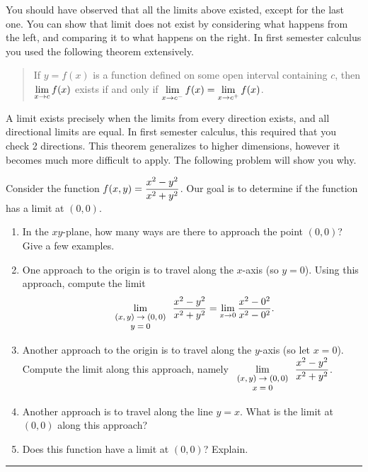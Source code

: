 You should have observed that all the limits above existed, except for the last one.  You can show that limit does not exist by considering what happens from the left, and comparing it to what happens on the right.  In first semester calculus you used the following theorem extensively. 
\begin{quote}
 If $y=f(x)$ is a function defined on some open interval containing $c$, then $\displaystyle\lim_{x\to c}f(x)$ exists if and only if  $\displaystyle\lim_{x\to c^-}f(x) = \displaystyle\lim_{x\to c^+}f(x)$.
\end{quote}
 A limit exists precisely when the limits from every direction exists, and all directional limits are equal. In first semester calculus, this required that you check 2 directions. This theorem generalizes to higher dimensions, however it becomes much more difficult to apply. The following problem will show you why.
\begin{problem}
 Consider the function $\displaystyle f(x,y)=\frac{x^2-y^2}{x^2+y^2}$.
Our goal is to determine if the function has a limit at $(0,0)$.
\begin{enumerate}
 \item In the $xy$-plane, how many ways are there to approach the point $(0,0)$? Give a few examples.
 \item One approach to the origin is to travel along the $x$-axis (so $y=0$). Using this approach, compute the limit 
$$\displaystyle\lim_{\text{\footnotesize $\begin{array}{c}(x,y)\to(0,0)\\ y=0\end{array}$}}\frac{x^2-y^2}{x^2+y^2} = \lim_{x\to 0} \frac{x^2-0^2}{x^2-0^2}.$$
 \item Another approach to the origin is to travel along the $y$-axis (so let $x=0$). Compute the limit along this approach, namely 
$\displaystyle\lim_{\text{\footnotesize $\begin{array}{c}(x,y)\to(0,0)\\ x=0\end{array}$}}\frac{x^2-y^2}{x^2+y^2}$.
 \item Another approach is to travel along the line $y=x$.  What is the limit at $(0,0)$ along this approach?
 \item Does this function have a limit at $(0,0)$? Explain. %
\end{enumerate}
\hrule\end{problem}

